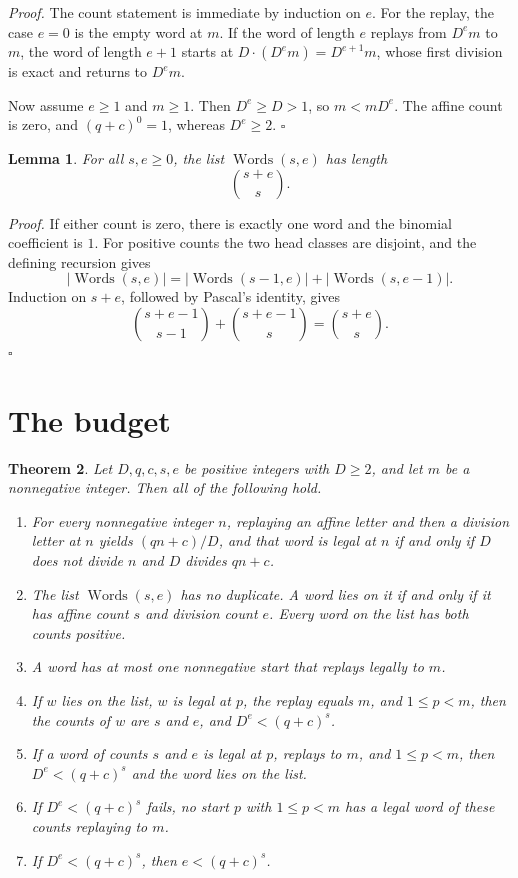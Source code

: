 \documentclass[11pt,letterpaper]{article}
\newtheorem{theorem}{Theorem}
\newtheorem{lemma}[theorem]{Lemma}
\newenvironment{proof}{\noindent\textit{Proof.}}{\hfill\(\square\)}
\begin{document}
\begin{proof}
The count statement is immediate by induction on \(e\). For the replay, the case \(e=0\) is the empty word at \(m\). If the word of length \(e\) replays from \(D^em\) to \(m\), the word of length \(e+1\) starts at \(D\cdot(D^em)=D^{e+1}m\), whose first division is exact and returns to \(D^em\).

Now assume \(e\ge 1\) and \(m\ge 1\). Then \(D^e\ge D>1\), so \(m<mD^e\). The affine count is zero, and \((q+c)^0=1\), whereas \(D^e\ge 2\).
\end{proof}

\begin{lemma}
\label{lem:word-count}
For all \(s,e\ge0\), the list \(\operatorname{Words}(s,e)\) has length
\[
\binom{s+e}{s}.
\]
\end{lemma}

\begin{proof}
If either count is zero, there is exactly one word and the binomial
coefficient is \(1\). For positive counts the two head classes are disjoint,
and the defining recursion gives
\[
|\operatorname{Words}(s,e)|
=|\operatorname{Words}(s-1,e)|+|\operatorname{Words}(s,e-1)|.
\]
Induction on \(s+e\), followed by Pascal's identity, gives
\[
\binom{s+e-1}{s-1}+\binom{s+e-1}{s}=\binom{s+e}{s}.
\]
\end{proof}

\section{The budget}

\begin{theorem}
\label{thm:inverse-budget}
Let \(D,q,c,s,e\) be positive integers with \(D\ge 2\), and let \(m\) be a nonnegative integer. Then all of the following hold.
\begin{enumerate}
\item For every nonnegative integer \(n\), replaying an affine letter and then a division letter at \(n\) yields \((qn+c)/D\), and that word is legal at \(n\) if and only if \(D\) does not divide \(n\) and \(D\) divides \(qn+c\).
\item The list \(\operatorname{Words}(s,e)\) has no duplicate. A word lies on it if and only if it has affine count \(s\) and division count \(e\). Every word on the list has both counts positive.
\item A word has at most one nonnegative start that replays legally to \(m\).
\item If \(w\) lies on the list, \(w\) is legal at \(p\), the replay equals \(m\), and \(1\le p<m\), then the counts of \(w\) are \(s\) and \(e\), and \(D^e<(q+c)^s\).
\item If a word of counts \(s\) and \(e\) is legal at \(p\), replays to \(m\), and \(1\le p<m\), then \(D^e<(q+c)^s\) and the word lies on the list.
\item If \(D^e<(q+c)^s\) fails, no start \(p\) with \(1\le p<m\) has a legal word of these counts replaying to \(m\).
\item If \(D^e<(q+c)^s\), then \(e<(q+c)^s\).
\end{enumerate}
\end{theorem}
\end{document}

